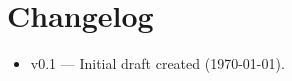 \section*{Changelog}

    \begin{itemize}
        \item v0.1 — Initial draft created (\today).  
    \end{itemize}
